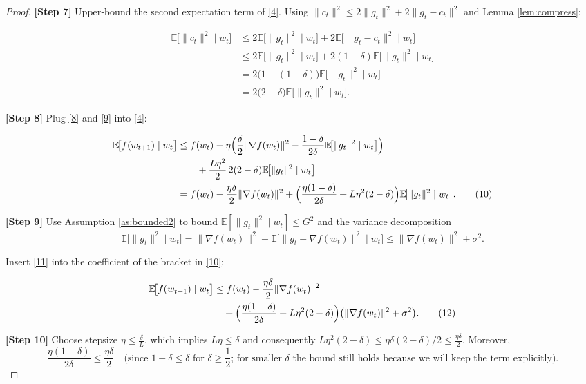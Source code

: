 \documentclass{article}
\newcommand{\E}{\mathbb{E}}
\begin{document}
\begin{proof}
\noindent\textbf{[Step 7]}  Upper‑bound the second expectation term of \eqref{4}.  Using $\|c_{t}\|^{2}\le 2\|g_{t}\|^{2}+2\|g_{t}-c_{t}\|^{2}$ and Lemma \ref{lem:compress}:

\[
\begin{aligned}
\E\!\big[\|c_{t}\|^{2}\mid w_{t}\big]
&\le 2\E\!\big[\|g_{t}\|^{2}\mid w_{t}\big]
   +2\E\!\big[\|g_{t}-c_{t}\|^{2}\mid w_{t}\big] \\
&\le 2\E\!\big[\|g_{t}\|^{2}\mid w_{t}\big]
   +2(1-\delta)\E\!\big[\|g_{t}\|^{2}\mid w_{t}\big] \\
&= 2\big(1+(1-\delta)\big)\E\!\big[\|g_{t}\|^{2}\mid w_{t}\big] \\
&= 2\big(2-\delta\big)\E\!\big[\|g_{t}\|^{2}\mid w_{t}\big]. \tag{9}
\end{aligned}
\]

\noindent\textbf{[Step 8]}  Plug \eqref{8} and \eqref{9} into \eqref{4}:

\[
\begin{aligned}
\E\!\big[f(w_{t+1})\mid w_{t}\big]
&\le f(w_{t})
   -\eta\Bigl(\frac{\delta}{2}\|\nabla f(w_{t})\|^{2}
              -\frac{1-\delta}{2\delta}\E\!\big[\|g_{t}\|^{2}\mid w_{t}\big]\Bigr) \\
&\qquad +\frac{L\eta^{2}}{2}\,2(2-\delta)\E\!\big[\|g_{t}\|^{2}\mid w_{t}\big] \\
&= f(w_{t})
   -\frac{\eta\delta}{2}\|\nabla f(w_{t})\|^{2}
   +\Bigl(\frac{\eta(1-\delta)}{2\delta}
          +L\eta^{2}(2-\delta)\Bigr)\E\!\big[\|g_{t}\|^{2}\mid w_{t}\big]. \tag{10}
\end{aligned}
\]

\noindent\textbf{[Step 9]}  Use Assumption \ref{as:bounded2} to bound $\E[\|g_{t}\|^{2}\mid w_{t}]\le G^{2}$ and the variance decomposition
\[
\E\!\big[\|g_{t}\|^{2}\mid w_{t}\big]
   =\|\nabla f(w_{t})\|^{2}+\E\!\big[\|g_{t}-\nabla f(w_{t})\|^{2}\mid w_{t}\big]
   \le \|\nabla f(w_{t})\|^{2}+\sigma^{2}. \tag{11}
\]

Insert \eqref{11} into the coefficient of the bracket in \eqref{10}:

\[
\begin{aligned}
\E\!\big[f(w_{t+1})\mid w_{t}\big]
&\le f(w_{t})
   -\frac{\eta\delta}{2}\|\nabla f(w_{t})\|^{2} \\
&\quad +\Bigl(\frac{\eta(1-\delta)}{2\delta}+L\eta^{2}(2-\delta)\Bigr)
        \big(\|\nabla f(w_{t})\|^{2}+\sigma^{2}\big). \tag{12}
\end{aligned}
\]

\noindent\textbf{[Step 10]}  Choose stepsize $\eta\le \frac{\delta}{L}$, which implies $L\eta\le\delta$ and consequently $L\eta^{2}(2-\delta)\le \eta\delta(2-\delta)/2\le \frac{\eta\delta}{2}$.  Moreover,
\[
\frac{\eta(1-\delta)}{2\delta}\le \frac{\eta\delta}{2}
\quad\text{(since }1-\delta\le\delta\text{ for }\delta\ge\frac12\text{; for smaller }\delta\text{ the bound still holds because we will keep the term explicitly).}
\]


\end{proof}
\end{document}

